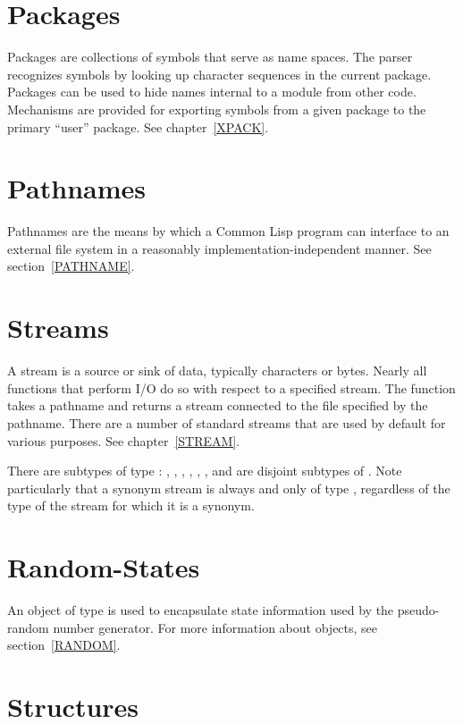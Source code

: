 \section{Packages}

Packages are collections of symbols that serve as name spaces.
The parser recognizes symbols by looking up character sequences
in the current package.  Packages can be used to hide
names internal to a module from other code.  Mechanisms are provided
for exporting symbols from a given package to the primary ``user'' package.
See chapter~\ref{XPACK}.

\section{Pathnames}
Pathnames are the means by which a Common Lisp program can
interface to an external file system in a reasonably implementation-independent
manner.  See section~\ref{PATHNAME}.

\section{Streams}

A stream is a source or sink of data, typically characters or bytes.
Nearly all functions that perform I/O do so with respect to a specified
stream.  The function  takes a pathname and returns a stream
connected to the file specified by the pathname.
There are a number of standard streams that are used by default for
various purposes.  See chapter~\ref{STREAM}.

There are subtypes of type :
, ,
, , , ,
and  are disjoint subtypes of .
Note particularly that a synonym stream is always and only of type
, regardless of the type of the stream for which it is a synonym.

\section{Random-States}

An object of type  is used to encapsulate
state information used by the pseudo-random number generator.
For more information about  objects,
see section~\ref{RANDOM}.

\section{Structures}

